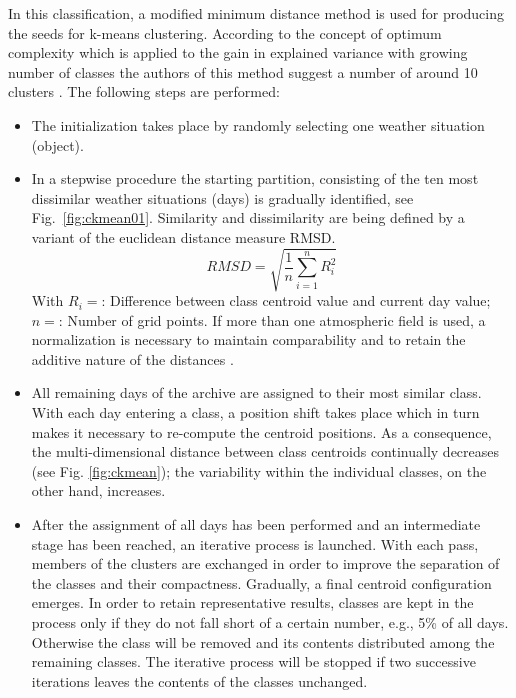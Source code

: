 \documentclass[12pt, oneside, a4paper, headsepline, plainheadsepline]{scrbook}
\begin{document}
In this classification, a modified minimum distance method is used for producing the seeds for 
k-means clustering. According to the concept of optimum complexity which is applied to the gain 
in explained variance with growing number of classes the authors of this method suggest a
number of around 10 clusters \citep{Enke1997}. The following steps are performed:
\begin{itemize}
\item The initialization takes place by randomly selecting one weather situation (object).
\item In a stepwise procedure the starting partition, consisting of the ten most dissimilar 
weather situations (days) is gradually identified, see Fig.~\ref{fig:ckmean01}. 
Similarity and dissimilarity are being 
defined by a variant of the euclidean distance measure RMSD. 
%
\begin{equation}
\label{equaRMSD}
 RMSD=\sqrt{\frac{1}{n}\sum^{n}_{i=1}R^{2}_{i} }
\end{equation}
%
\noindent With $R_i =$: Difference between class centroid value and current day value;  $n =$: Number of grid points.
If more than one atmospheric field is used, 
a normalization is necessary to maintain comparability and to retain the additive nature 
of the distances \citep[for more details see]{Enke2005a}.

\item All remaining days of the archive are assigned to their most similar class. 
With each day entering a class, a position shift takes place which in turn makes it necessary to re-compute 
the centroid positions. As a consequence, the multi-dimensional distance between class centroids continually 
decreases (see Fig. \ref{fig:ckmean}); the variability within the individual classes, on the other hand, increases. 
\item After the assignment of all days has been performed and an intermediate stage has been reached, 
an iterative process is launched. With each pass, members of the clusters are exchanged in order to improve 
the separation of the classes and their compactness. Gradually, a final centroid configuration emerges. 
In order to retain representative results, classes are kept in the process only if they do not fall short of 
a certain number, e.g., 5\% of all days. Otherwise the class will be removed and its contents distributed 
among the remaining classes. The iterative process will be stopped if two successive iterations leaves the 
contents of the classes unchanged.
\end{itemize}
\end{document}
